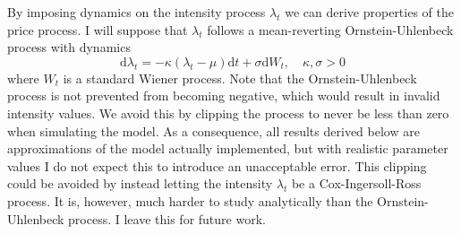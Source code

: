 \documentclass[a4paper, 12pt]{article}
\begin{document}
By imposing dynamics on the intensity process \(\lambda_t\) we can derive properties of the price process. I will suppose that \(\lambda_t\) follows a mean-reverting Ornstein-Uhlenbeck process with dynamics
\begin{equation*}
  \mathrm{d}\lambda_t = -\kappa(\lambda_t - \mu)\mathrm{d}t + \sigma \mathrm{d}W_t, \quad \kappa,\sigma>0
\end{equation*}
where \(W_t\) is a standard Wiener process. Note that the Ornstein-Uhlenbeck process is not prevented from becoming negative, which would result in invalid intensity values. We avoid this by clipping the process to never be less than zero when simulating the model. As a consequence, all results derived below are approximations of the model actually implemented, but with realistic parameter values I do not expect this to introduce an unacceptable error. This clipping could be avoided by instead letting the intensity \(\lambda_t\) be a Cox-Ingersoll-Ross process. It is, however, much harder to study analytically than the Ornstein-Uhlenbeck process. I leave this for future work. 
\end{document}
